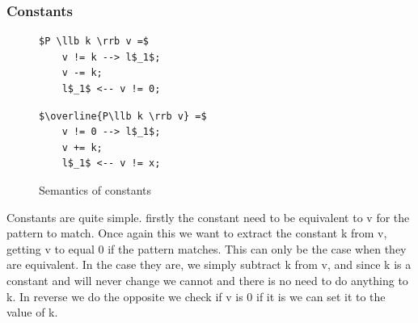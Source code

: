 \documentclass[a4paper]{article}
\begin{document}
\subsubsection{Constants}
\label{sec:org0f48a46}
\begin{figure}[!htb]
\begin{minipage}{0.4\textwidth}
\begin{lstlisting}
$P \llb k \rrb v =$
    v != k --> l$_1$;
    v -= k;
    l$_1$ <-- v != 0;
\end{lstlisting}
\end{minipage}
\qquad
\begin{minipage}{0.4\textwidth}
\begin{lstlisting}
$\overline{P\llb k \rrb v} =$
    v != 0 --> l$_1$;
    v += k;
    l$_1$ <-- v != x;
\end{lstlisting}
\end{minipage}

\caption{Semantics of constants}
\label{constants}
\end{figure}
Constants are quite simple. firstly the constant need to be equivalent to v for the pattern to match. Once again this we want to extract the constant k from v, getting v to equal 0 if the pattern matches. This can only be the case when they are equivalent. In the case they are, we simply subtract k from v, and since k is a constant and will never change we cannot and there is no need to do anything to k. In reverse we do the opposite we check if v is 0 if it is we can set it to the value of k.
\end{document}

